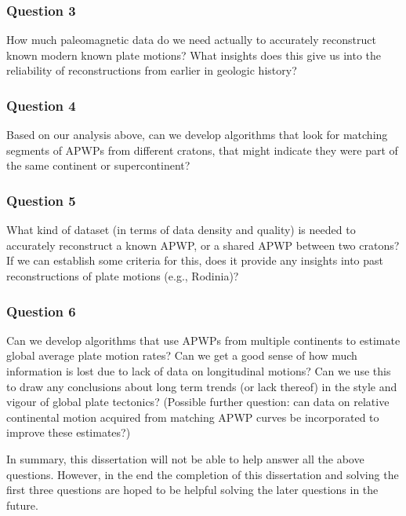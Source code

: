 \subsubsection{Question 3}

How much paleomagnetic data do we need actually to accurately reconstruct known
modern known plate motions? What insights does this give us into the
reliability of reconstructions from earlier in geologic history?

\subsubsection{Question 4}

Based on our analysis above, can we develop algorithms that look for matching
segments of APWPs from different cratons, that might indicate they were part of
the same continent or supercontinent?

\subsubsection{Question 5}

What kind of dataset (in terms of data density and quality) is needed to
accurately reconstruct a known APWP, or a shared APWP between two cratons? If
we can establish some criteria for this, does it provide any insights into past
reconstructions of plate motions (e.g., Rodinia)?

\subsubsection{Question 6}

Can we develop algorithms that use APWPs from multiple continents to estimate
global average plate motion rates? Can we get a good sense of how much
information is lost due to lack of data on longitudinal motions? Can we use
this to draw any conclusions about long term trends (or lack thereof) in the
style and vigour of global plate tectonics? (Possible further question: can
data on relative continental motion acquired from matching APWP curves be
incorporated to improve these estimates?)

In summary, this dissertation will not be able to help answer all the above
questions. However, in the end the completion of this dissertation and solving
the first three questions are hoped to be helpful solving the later questions in
the future.
